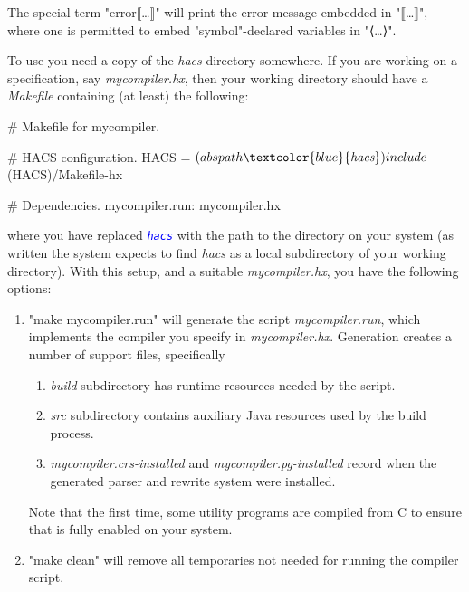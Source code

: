\documentclass[11pt]{article} %
\begin{document}
\begin{manual}
  The special term "error⟦…⟧" will print the error message embedded in "⟦…⟧", where one is permitted
  to embed "symbol"-declared variables in "⟨…⟩".
\end{manual}

\begin{manual}\label{man:run}\leavevmode
  To use \HAX you need a copy of the \emph{hacs} directory somewhere. If you are working on a \HAX
  specification, say \emph{mycompiler.hx}, then your working directory should have a \emph{Makefile}
  containing (at least) the following:
\begin{code}[xleftmargin=1.66em,numbers=left,commandchars=\\\{\}]
# Makefile for mycompiler.

# HACS configuration.
HACS = $(abspath \textcolor{blue}{\emph{hacs}})
include $(HACS)/Makefile-hx

# Dependencies.
mycompiler.run: mycompiler.hx
\end{code}
  where you have replaced \texttt{\textcolor{blue}{\emph{hacs}}} with the path to the \HAX directory
  on your system (as written the system expects to find \emph{hacs} as a local subdirectory of your
  working directory). With this setup, and a suitable \emph{mycompiler.hx}, you have the following
  options:
  \begin{enumerate}

  \item "make mycompiler.run" will generate the script \emph{mycompiler.run}, which implements the
    compiler you specify in \emph{mycompiler.hx}. Generation creates a number of support files,
    specifically
    \begin{enumerate}
    \item \emph{build} subdirectory has runtime resources needed by the script.
    \item \emph{src} subdirectory contains auxiliary Java resources used by the build process.
    \item \emph{mycompiler.crs-installed} and \emph{mycompiler.pg-installed} record when the
      generated parser and rewrite system were installed.
    \end{enumerate}
    Note that the first time, some utility programs are compiled from C to ensure that \HAX is fully
    enabled on your system.

  \item "make clean" will remove all temporaries not needed for running the compiler script.


\end{enumerate}
\end{manual}
\end{document}
